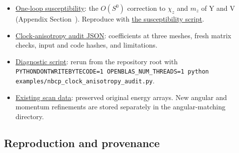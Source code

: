 \begin{itemize}
{  magnetic cells}: the LSWT-unstable points of the four-site harmonic
  scan, their grid neighbours and two reference points, with cells of up
  to 36 sites, the stability test on two meshes and the boundary check
  (). Reproduce with
  \href{../../../examples/nbcp_hatched_region_search.py}{the cell search script}.
\item
  \href{../../../data-space/verification/261002-one-loop-susceptibility/one-loop-susceptibility.json}{One-loop
  susceptibility}: the \(O(S^0)\) correction to \(\chi_z\) and
  \(m_z\) of Y and V (Appendix Section~).
  Reproduce with
  \href{../../../examples/nbcp_one_loop_susceptibility.py}{the
  susceptibility script}.
\item
  \href{../../../data-space/verification/260916-clock-anisotropy/clock-anisotropy-audit.json}{Clock-anisotropy
  audit JSON}: coefficients at three meshes, fresh matrix checks, input
  and code hashes, and limitations.
\item
  \href{../../../examples/nbcp_clock_anisotropy_audit.py}{Diagnostic
  script}: rerun from the repository root with
  {\small\texttt{\nolinkurl{PYTHONDONTWRITEBYTECODE=1 OPENBLAS_NUM_THREADS=1 python examples/nbcp_clock_anisotropy_audit.py}}}.
\item
  \href{../../../data-space/verification/260912-pseudo-goldstone}{Existing
  scan data}: preserved original energy arrays. New angular and momentum
  refinements are stored separately in the angular-matching directory.
\end{itemize}

\clearpage

\subsection{Reproduction and provenance}\label{sec-reproduction}

